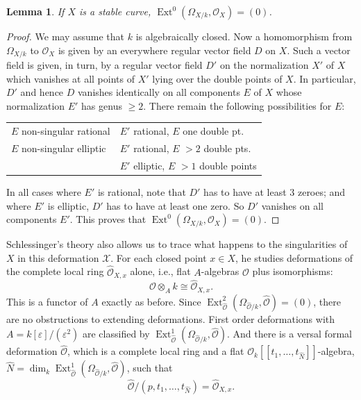\documentclass[10pt]{amsart}
\theoremstyle{plain}
\newtheorem{lemma}[theorem]{Lemma}
\theoremstyle{definition}
\DeclareMathOperator{\Ext}{Ext}
\newcommand{\cO}{\mathcal{O}}
\begin{document}
\begin{lemma}\label{lem:1.4}
If $X$ is a stable curve, $\Ext^0(\Omega_{X/k}, \cO_X) = (0)$.
\end{lemma}

\begin{proof}
We may assume that $k$ is algebraically closed. Now a homomorphism from $\Omega_{X/k}$ to $\cO_X$ is given by an everywhere regular vector field $D$ on $X$. Such a vector field is given, in turn, by a regular vector field $D'$ on the normalization $X'$ of $X$ which vanishes at all points of $X'$ lying over the double points of $X$. In particular, $D'$ and hence $D$ vanishes identically on all components $E$ of $X$ whose normalization $E'$ has genus $\geq 2$. There remain the following possibilities for $E$:

\begin{center}
\begin{tabular}{ll}
$E$ non-singular rational & $E'$ rational, $E$ one double pt. \\
$E$ non-singular elliptic & $E'$ rational, $E$ $> 2$ double pts. \\
& $E'$ elliptic, $E$ $> 1$ double points
\end{tabular}
\end{center}

In all cases where $E'$ is rational, note that $D'$ has to have at least $3$ zeroes; and where $E'$ is elliptic, $D'$ has to have at least one zero. So $D'$ vanishes on all components $E'$. This proves that $\Ext^0(\Omega_{X/k}, \cO_X) = (0)$.
\end{proof}

Schlessinger's theory also allows us to trace what happens to the singularities of $X$ in this deformation $\mathscr{X}$. For each closed point $x \in X$, he studies deformations of the complete local ring $\widehat{\cO}_{X,x}$ alone, i.e., flat $A$-algebras $\mathcal{O}$ plus isomorphisms:
\[
\mathcal{O} \otimes_A k \cong \widehat{\cO}_{X,x}.
\]
This is a functor of $A$ exactly as before. Since $\Ext^2_{\widehat{\cO}}(\Omega_{\widehat{\cO}/k}, \widehat{\cO}) = (0)$, there are no obstructions to extending deformations. First order deformations with $A = k[\varepsilon]/(\varepsilon^2)$ are classified by $\Ext^1_{\widehat{\cO}}(\Omega_{\widehat{\cO}/k}, \widehat{\cO})$. And there is a versal formal deformation $\widehat{\mathcal{O}}$, which is a complete local ring and a flat $\mathcal{O}_k[[t_1, \ldots, t_{\widehat{N}}]]$-algebra, $\widehat{N} = \dim_k \Ext^1_{\widehat{\cO}}(\Omega_{\widehat{\cO}/k}, \widehat{\cO})$, such that
\[
\widehat{\mathcal{O}}/(p, t_1, \ldots, t_{\widehat{N}}) = \widehat{\cO}_{X,x}.
\]
\end{document}
